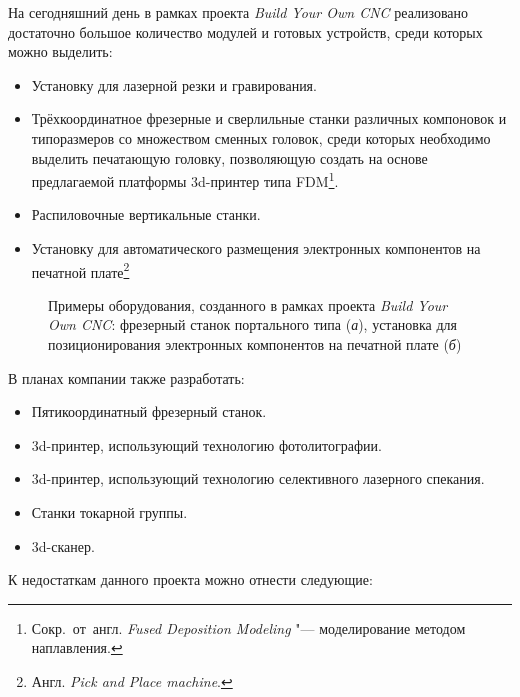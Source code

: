 На сегодняшний день в рамках проекта \textit{Build Your Own CNC} реализовано достаточно большое количество модулей и готовых устройств, среди которых можно выделить:

\begin{itemize}
	\item Установку для лазерной резки и гравирования.
	\item Трёхкоординатное фрезерные и сверлильные станки различных компоновок и типоразмеров со множеством сменных головок, среди которых необходимо выделить печатающую головку, позволяющую создать на основе предлагаемой платформы 3d-принтер типа FDM\footnote{Сокр.~от~англ. \textit{Fused Deposition Modeling} "--- моделирование методом наплавления.}.
	\item Распиловочные вертикальные станки.
	\item Установку для автоматического размещения электронных компонентов на печатной плате\footnote{Англ. \textit{Pick and Place machine}.}
\end{itemize}

\begin{figure}[ht]
	\caption[Примеры оборудования, созданного в рамках проекта Build Your Own~CNC]%
	{Примеры оборудования, созданного в рамках проекта \textit{Build Your Own CNC}: фрезерный станок портального типа (\textit{а}), установка для позиционирования электронных компонентов на печатной плате (\textit{б})}\label{fig:byocnc}
\end{figure}

В планах компании также разработать:

\begin{itemize}
	\item Пятикоординатный фрезерный станок.	
	\item 3d-принтер, использующий технологию фотолитографии.
	\item 3d-принтер, использующий технологию селективного лазерного спекания.
	\item Станки токарной группы.
	\item 3d-сканер.
\end{itemize}

К недостаткам данного проекта можно отнести следующие:

